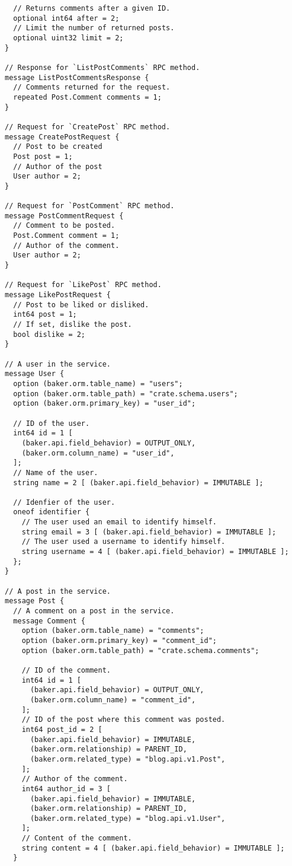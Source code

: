 \begin{verbatim}
  // Returns comments after a given ID.
  optional int64 after = 2;
  // Limit the number of returned posts.
  optional uint32 limit = 2;
}

// Response for `ListPostComments` RPC method.
message ListPostCommentsResponse {
  // Comments returned for the request.
  repeated Post.Comment comments = 1;
}

// Request for `CreatePost` RPC method.
message CreatePostRequest {
  // Post to be created
  Post post = 1;
  // Author of the post
  User author = 2;
}

// Request for `PostComment` RPC method.
message PostCommentRequest {
  // Comment to be posted.
  Post.Comment comment = 1;
  // Author of the comment.
  User author = 2;
}

// Request for `LikePost` RPC method.
message LikePostRequest {
  // Post to be liked or disliked.
  int64 post = 1;
  // If set, dislike the post.
  bool dislike = 2;
}

// A user in the service.
message User {
  option (baker.orm.table_name) = "users";
  option (baker.orm.table_path) = "crate.schema.users";
  option (baker.orm.primary_key) = "user_id";

  // ID of the user.
  int64 id = 1 [
    (baker.api.field_behavior) = OUTPUT_ONLY,
    (baker.orm.column_name) = "user_id",
  ];
  // Name of the user.
  string name = 2 [ (baker.api.field_behavior) = IMMUTABLE ];

  // Idenfier of the user.
  oneof identifier {
    // The user used an email to identify himself.
    string email = 3 [ (baker.api.field_behavior) = IMMUTABLE ];
    // The user used a username to identify himself.
    string username = 4 [ (baker.api.field_behavior) = IMMUTABLE ];
  };
}

// A post in the service.
message Post {
  // A comment on a post in the service.
  message Comment {
    option (baker.orm.table_name) = "comments";
    option (baker.orm.primary_key) = "comment_id";
    option (baker.orm.table_path) = "crate.schema.comments";

    // ID of the comment.
    int64 id = 1 [
      (baker.api.field_behavior) = OUTPUT_ONLY,
      (baker.orm.column_name) = "comment_id",
    ];
    // ID of the post where this comment was posted.
    int64 post_id = 2 [
      (baker.api.field_behavior) = IMMUTABLE,
      (baker.orm.relationship) = PARENT_ID,
      (baker.orm.related_type) = "blog.api.v1.Post",
    ];
    // Author of the comment.
    int64 author_id = 3 [
      (baker.api.field_behavior) = IMMUTABLE,
      (baker.orm.relationship) = PARENT_ID,
      (baker.orm.related_type) = "blog.api.v1.User",
    ];
    // Content of the comment.
    string content = 4 [ (baker.api.field_behavior) = IMMUTABLE ];
  }


\end{verbatim}
